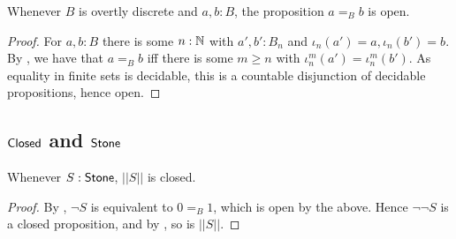 \begin{lemma}
  Whenever $B$ is overtly discrete and $a,b:B$, the proposition $a=_B b$ is open. 
\end{lemma}
\begin{proof}
  For $a,b:B$ there is some $n:\mathbb{N}$ with $a',b':B_n$ and $\iota_n(a') = a,\iota_n(b') = b$.
  By , we have that $a=_B b$ iff 
  there is some $m\geq n$ with $\iota_n^m (a') = \iota_n^m(b')$. 
  As equality in finite sets is decidable, this is a countable disjunction of decidable propositions, hence open. 
\end{proof}
\subsection{$\mathsf{Closed}$ and $\mathsf{Stone}$}

\begin{corollary}\label{TruncationStoneClosed}
  Whenever $S:\mathsf{Stone}$, $||S||$ is closed. 
\end{corollary}
\begin{proof}
  By , $\neg S$ is equivalent to $0=_B 1$, which is open by the above. 
  Hence $\neg \neg S$ is a closed proposition, and by , so is $||S||$. 
\end{proof}


